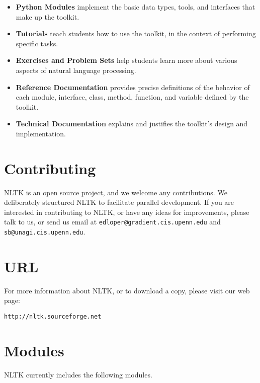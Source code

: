 \documentclass[11pt]{article}
\def\nogap{\setlength\itemsep{.0in}\setlength{\parskip}{0in}}
\begin{document}
\begin{itemize}\nogap
    \item \textbf{Python Modules} implement the basic data types,
      tools, and interfaces that make up the toolkit.

    \item \textbf{Tutorials} teach students how to use the toolkit, in the
      context of performing specific tasks.

    \item \textbf{Exercises and Problem Sets} help students learn more about
      various aspects of natural language processing.

    \item \textbf{Reference Documentation} provides precise definitions of the
      behavior of each module, interface, class, method, function, and
      variable defined by the toolkit.  

    \item \textbf{Technical Documentation} explains and justifies the
      toolkit's design and implementation. 
\end{itemize}

\section*{Contributing}
\thispagestyle{empty}

NLTK is an open source project, and we welcome any contributions.  We
deliberately structured NLTK to facilitate parallel development.  If
you are interested in contributing to NLTK, or have any ideas for
improvements, please talk to us, or send us email at
\texttt{edloper@gradient.cis.upenn.edu} and
\texttt{sb@unagi.cis.upenn.edu}.  

\section*{URL}

For more information about NLTK, or to download a copy, please
visit our web page: 

\texttt{http://nltk.sourceforge.net}

\section*{Modules}
\thispagestyle{empty}

NLTK currently includes the following modules.
\end{document}
